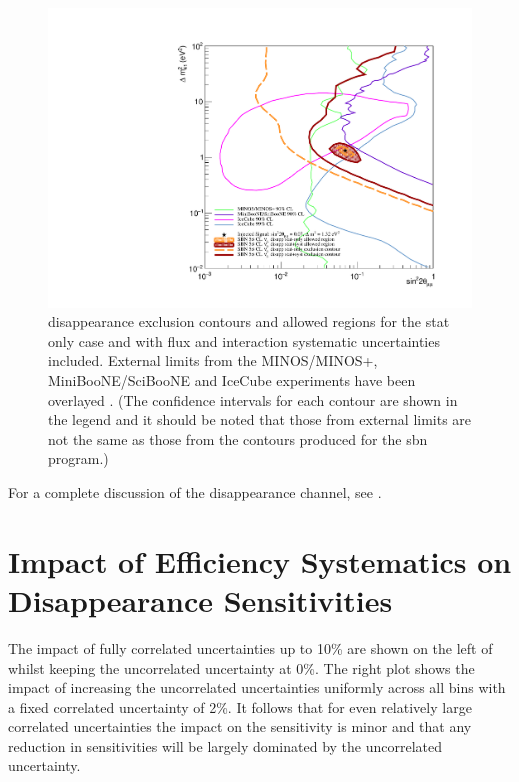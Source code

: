 \begin{figure}[h!]
    \centering
    \includegraphics[width = \largefigwidth]{figures-chap6/overlays/valor_overlays_numu_disapp.pdf}
    \caption[\numu disappearance contours with external limits.]{\numu disappearance exclusion contours and allowed regions for the stat only case and with flux and interaction systematic uncertainties included. External limits from the MINOS/MINOS+, MiniBooNE/SciBooNE and IceCube experiments have been overlayed \cite{MINOS_numu_disapp_contour}\cite{MiniBooNE/SciBooNE_numu_disapp_contour}\cite{IceCube_numu_disapp_contour}. (The confidence intervals for each contour are shown in the legend and it should be noted that those from external limits are not the same as those from the contours produced for the \gls{sbn} program.)}
    \label{fig:numu_disapp_global_sensitivity}
\end{figure}

\newpage

For a complete discussion of the \numu disappearance channel, see \cite{Rhiannon's_thesis}.


\section*{\texorpdfstring{Impact of Efficiency Systematics on \numu Disappearance Sensitivities}{Impact of Efficiency Systematics on numu Disappearance Sensitivities}}


The impact of fully correlated uncertainties up to 10\% are shown on the left of  whilst keeping the uncorrelated uncertainty at 0\%. The right plot shows the impact of increasing the uncorrelated uncertainties uniformly across all bins with a fixed correlated uncertainty of 2\%. It follows that for even relatively large correlated uncertainties the impact on the sensitivity is minor and that any reduction in sensitivities will be largely dominated by the uncorrelated uncertainty. 

